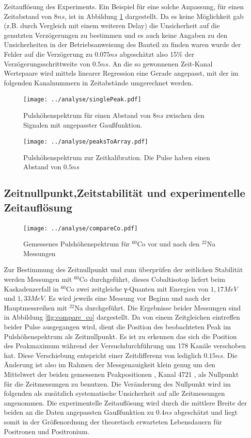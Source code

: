 \documentclass[a4paper,12pt]{article}
\begin{document}
Zeitauflösung des Experiments. Ein Beispiel für eine solche Anpassung, für einen Zeitabstand von $8\si{ns}$, ist in Abbildung \ref{fig:singlePuls} dargestellt.
 Da es keine Möglichkeit gab (z.B. durch Vergleich mit einem weiteren Delay) die Unsicherheit auf die genutzten Verzögerungen zu bestimmen und es auch keine Angaben zu
den Unsicherheiten in der Betriebsanweisung des Bauteil zu finden waren wurde der Fehler auf die Verzögerung zu $0.075\si{ns}$ abgeschätzt also 
15\% der Verzögerungsschrittweite von $0.5\si{ns}$. An die so gewonnenen Zeit-Kanal Wertepaare wird mittels linearer Regression eine Gerade angepasst, mit der im folgenden 
Kanalnummern in Zeitabstände umgerechnet werden. 

\begin{figure}
	\texttt{[image: ../analyse/singlePeak.pdf]}
	\caption{Pulshöhenspektrum für einen Abstand von $8\si{ns}$ zwischen den Signalen mit angepasster Gaußfunktion.}
	\label{fig:singlePuls}
\end{figure}

\begin{figure}
	\texttt{[image: ../analyse/peaksToArray.pdf]}
	\caption{Pulshöhenspektrum zur Zeitkalibration. Die Pulse haben einen Abstand von $0.5\si{ns}$}
	\label{fig:timepuls}
\end{figure}

\subsection{Zeitnullpunkt,Zeitstabilität und experimentelle Zeitauflösung}
	\begin{figure}
	\texttt{[image: ../analyse/compareCo.pdf]}
	\caption{Gemessenes Pulshöhenspektrum für $^{60}$Co vor und nach den $^{22}$Na Messungen}
	\label{fig:timepuls}
	\end{figure}
	Zur Bestimmung des Zeitnullpunkt und zum überprüfen der zeitlichen Stabilität werden Messungen mit $^{60}$Co durchgeführt, dieses Cobaltisotop liefert 
	beim Kaskadenzerfall in $^{60}$Co zwei zeitgleiche γ-Quanten mit Energien von $1,17\si{MeV}$ und $1,33\si{MeV}$. Es wird jeweils eine Messung vor Beginn
	und nach der Hauptmessreihen mit $^{22}$Na durchgeführt. Die Ergebnisse beider Messungen sind in Abbildung \ref{fig:compare_co} dargestellt.
	Da von einem Zeitgleichen eintreffen beider Pulse ausgegangen wird, dient die Position des beobachteten Peak im Pulshöhenspektrum als Zeitnullpunkt. Es
	ist zu erkennen das sich die Position des Peakmaximum während der Versuchdurchführung um 178 Kanäle verschoben hat. Diese Verschiebung entspricht einer
	Zeitdifferenz von lediglich $0.15\si{ns}$. Die Änderung ist also im Rahmen der Messgenauigkeit klein genug um den Mittelwert der
	beiden gemessenen Peakpositionen , Kanal 4721 , als Nullpunkt für die Zeitmessungen zu benutzen. Die Veränderung des Nullpunkt wird im folgenden
	als zusätzlich systematische Unsicherheit auf alle Zeitmessungen angenommen. Die experimentelle Zeitauflösung wird durch die mittlere Breite der beiden an die 
	Daten angepassten Gaußfunktion zu $0.4\si{ns}$ abgeschätzt und liegt somit in der Größenordnung der theoretisch erwarteten Lebensdauern für Positronen und Positronium.  
	
\end{document}
